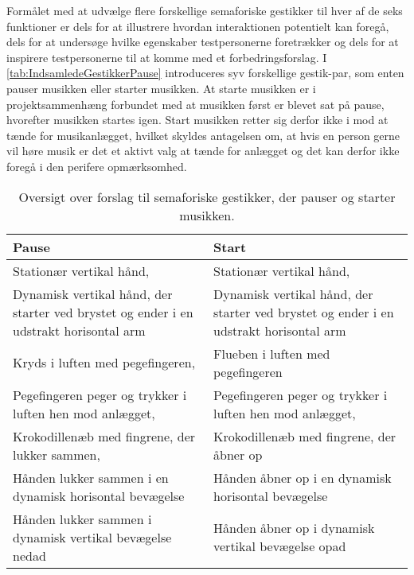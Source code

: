 Formålet med at udvælge flere forskellige semaforiske gestikker til hver af de seks funktioner er dels for at illustrere hvordan interaktionen potentielt kan foregå, dels for at undersøge hvilke egenskaber testpersonerne foretrækker og dels for at inspirere testpersonerne til at komme med et forbedringsforslag. \blankline
%
I \autoref{tab:IndsamledeGestikkerPause} introduceres syv forskellige gestik-par, som enten pauser musikken eller starter musikken. At starte musikken er i projektsammenhæng forbundet med at musikken først er blevet sat på pause, hvorefter musikken startes igen. Start musikken retter sig derfor ikke i mod at tænde for musikanlægget, hvilket skyldes antagelsen om, at hvis en person gerne vil høre musik er det et aktivt valg at tænde for anlægget og det kan derfor ikke foregå i den perifere opmærksomhed.   
%
\begin{table}[H]
	\centering
	\begin{tabular}{| p{6cm} | p{6cm} | }
		\hline
		\textbf{Pause} & \textbf{Start} \\ \hline
		Stationær vertikal hånd, \parencite[s. 166]{PDF:ComparingInputModalities} & Stationær vertikal hånd, \parencite[s. 166]{PDF:ComparingInputModalities} \\ \hline
		Dynamisk vertikal hånd, der starter ved brystet og ender i en udstrakt horisontal arm  & Dynamisk vertikal hånd, der starter ved brystet og ender i en udstrakt horisontal arm  \\ \hline
		Kryds i luften med pegefingeren, \parencite[s. 48]{PDF:UserDefinedGesturesTV} & Flueben i luften med pegefingeren\\ \hline
		Pegefingeren peger og trykker i luften hen mod anlægget, \parencite{WEB:BeosoundMoment, WEB:Beosound2} & Pegefingeren peger og trykker i luften hen mod anlægget, \parencite[s. 48]{WEB:BeosoundMoment, WEB:Beosound2, PDF:UserDefinedGesturesTV} \\ \hline
		Krokodillenæb med fingrene, der lukker sammen, \parencite[s. 48]{PDF:UserDefinedGesturesTV} & Krokodillenæb med fingrene, der åbner op \\ \hline
		Hånden lukker sammen i en dynamisk horisontal bevægelse & Hånden åbner op i en dynamisk horisontal bevægelse \\ \hline
		Hånden lukker sammen i dynamisk vertikal bevægelse nedad & Hånden åbner op i dynamisk vertikal bevægelse opad  \\ \hline
	\end{tabular}
	\caption{Oversigt over forslag til semaforiske gestikker, der pauser og starter musikken.}
	\label{tab:IndsamledeGestikkerPause}
\end{table}
